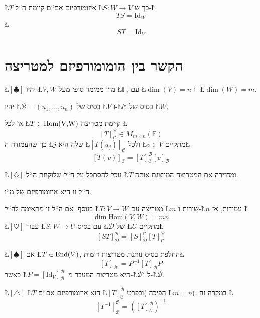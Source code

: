 \documentclass[english,hebrew]{article}
\begin{document}
\L{$T$} איזומורפיזם אם\textquotedblleft ם קיימת ה\textquotedblleft ל
\L{$S:W\rightarrow V$} כך ש-\L{%
\[
TS=\text{Id}_{W}
\]
}%
\L{%
\[
ST=\text{Id}_{V}
\]
}%

\section{הקשר בין הומומורפיזם למטריצה}

\L{$\left[\clubsuit\right]$} יהיו \L{$V,W$} מ\textquotedblleft ו
ממימד סופי מעל \L{$\mathbb{F}$}, עם \L{$\dim(V)=n$} ו- \L{$\dim(W)=m$}.

יהיו \L{$\mathcal{B}=\left(u_{1},\dots,u_{n}\right)$} בסיס של \L{$V$}
ו-\L{$\mathcal{C}$} בסיס של \L{$W$}.

אז לכל \L{$T\in\text{\text{Hom}(V,W)}$} קיימת מטריצה \L{%
\[
\left[T\right]_{\mathcal{C}}^{\mathcal{B}}\in M_{m\times n}\left(\mathbb{F}\right)
\]
}%
כך שהעמודה ה-\L{$j$} שלה היא \L{$\left[T\left(u_{j}\right)\right]_{\mathcal{C}}$}
ולכל \L{$v\in V$} מתקיים\L{%
\[
\left[T(v)\right]_{\mathcal{C}}=\left[T\right]_{\mathcal{C}}^{\mathcal{B}}\left[v\right]_{\mathcal{B}}
\]
}%

\L{$\left[\diamondsuit\right]$} נוכל להסתכל על ה\textquotedblleft ל
שלוקחת ה\textquotedblleft ל \L{$T$} ומחזירה את המטריצה המייצגת אותה.

ה\textquotedblleft ל זו היא איזומורפיזם של מ\textquotedblleft ו. 

בנוסף, אם ה\textquotedblleft ל זו מתאימה לה\textquotedblleft ל \L{$T:V\rightarrow W$}
מטריצה עם \L{$m$} שורות ו-\L{$n$} עמודות, אז \L{%
\[
\dim\text{Hom}\left(V,W\right)=mn
\]
}%
\L{$\left[\heartsuit\right]$} עבור \L{$S:W\rightarrow U$} עם בסיס
\L{$\mathcal{D}$} של \L{$U$} מתקיים\L{%
\[
\left[ST\right]_{\mathcal{D}}^{\mathcal{B}}=\left[S\right]_{\mathcal{D}}^{\mathcal{C}}\left[T\right]_{\mathcal{C}}^{\mathcal{B}}
\]
}%

\L{$\left[\spadesuit\right]$} אם \L{$T\in\text{End\ensuremath{\left(V\right)}}$},
החלפת בסיס נותנת מטריצות דומות\L{%
\[
\left[T\right]_{\mathcal{B}'}=P^{-1}\left[T\right]_{\mathcal{B}}P
\]
}%
 כאשר \L{$P=\left[\text{Id}_{V}\right]_{\mathcal{B}}^{\mathcal{B}'}$}
היא מטריצת המעבר מ-\L{$\mathcal{B}'$} ל-\L{$\mathcal{B}$}. 

\L{$\left[\triangle\right]$} \L{$T$} הוא איזומורפיזם אם\textquotedblleft ם
\L{$\left[T\right]_{\mathcal{C}}^{\mathcal{B}}$} הפיכה )ובפרט \L{$m=n$}(.
במקרה זה \L{%
\[
\left[T^{-1}\right]_{\mathcal{B}}^{\mathcal{C}}=\left(\left[T\right]_{\mathcal{C}}^{\mathcal{B}}\right)^{-1}
\]
}%
\end{document}
